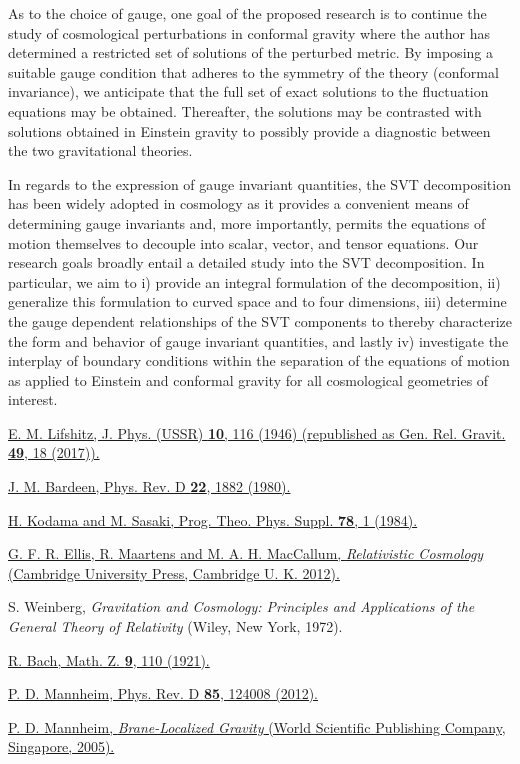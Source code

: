 \documentclass[10pt,letterpaper]{article}
\numberwithin{equation}{section}
\begin{document}
\indent As to the choice of gauge, one goal of the proposed research is to continue the study of cosmological perturbations in conformal gravity \cite{Mannheim2012a} where the author has determined a restricted set of solutions of the perturbed metric. By imposing a suitable gauge condition that adheres to the symmetry of the theory (conformal invariance), we anticipate that the full set of exact solutions to the fluctuation equations may be obtained. Thereafter, the solutions may be contrasted with solutions obtained in Einstein gravity to possibly provide a diagnostic between the two gravitational theories. 

\indent In regards to the expression of gauge invariant quantities, the SVT decomposition has been widely adopted in cosmology as it provides a convenient means of determining gauge invariants \cite{Kodama1984}\cite{Ellis2012} and, more importantly, permits the equations of motion themselves to decouple into scalar, vector, and tensor equations. Our research goals broadly entail a detailed study into the SVT decomposition. In particular, we aim to i) provide an integral formulation of the decomposition, ii) generalize this formulation to curved space and to four dimensions, iii) determine the gauge dependent relationships of the SVT components to thereby characterize the form and behavior of gauge invariant quantities, and lastly iv) investigate the interplay of boundary conditions within the separation of the equations of motion as applied to Einstein and conformal gravity for all cosmological geometries of interest. 

\begin{thebibliography}{99}
	
	 \href{https://doi.org/10.1007/s10714-016-2165-8}{E. M. Lifshitz, J. Phys. (USSR) {\bf 10}, 116 (1946) (republished as Gen. Rel. Gravit. \textbf{49}, 18  (2017)).}
	
	 \href{https://doi.org/10.1103/PhysRevD.22.1882}{J. M. Bardeen, Phys. Rev. D \textbf{22}, 1882 (1980).}
	
	 \href{https://doi.org/10.1143/PTPS.78.1}{H. Kodama and M. Sasaki, Prog. Theo. Phys. Suppl. {\bf 78}, 1 (1984).}
	
	 \href{https://doi.org/10.1017/CBO9781139014403}{G. F. R. Ellis, R. Maartens and  M. A. H. MacCallum, {\it Relativistic Cosmology} (Cambridge University Press,  Cambridge U. K. 2012).}
	
	 S. Weinberg, {\it Gravitation and Cosmology:
		Principles  and Applications of the General Theory of Relativity} (Wiley, New York, 1972).
	
	 \href{https://doi.org/10.1007/BF01378338}{R. Bach, Math. Z.  \textbf{9}, 110 (1921).}
	
	
	  \href{https://doi.org/10.1103/PhysRevD.85.124008}{P. D. Mannheim, Phys. Rev. D {\bf 85}, 124008 (2012).}
	
	  \href{https://doi.org/10.1142/5975}{P. D. Mannheim, \textit{Brane-Localized Gravity} (World Scientific Publishing Company, Singapore, 2005).}
	
\end{thebibliography} 
\end{document}
